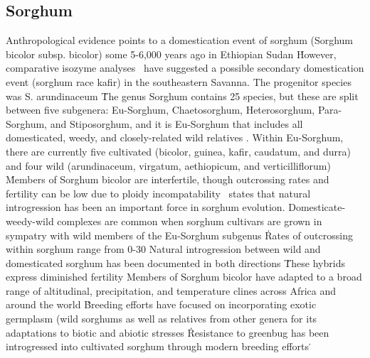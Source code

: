\documentclass[11pt]{article}
\begin{document}
\subsection*{Sorghum}
Anthropological evidence points to a domestication event of sorghum (Sorghum bicolor subsp. bicolor) some 5-6,000 years ago in Ethiopian Sudan \cite{smith2000sorghum}\.
However, comparative isozyme analyses \cite{shechter1975comparative}\ have suggested a possible secondary domestication event (sorghum race kafir) in the southeastern Savanna.
The progenitor species was S. arundinaceum \cite{doggett1988sorghum, harlan1971toward}\.
The genus Sorghum contains 25 species, but these are split between five subgenera: Eu-Sorghum, Chaetosorghum, Heterosorghum, Para-Sorghum, and Stiposorghum, and it is Eu-Sorghum that includes all domesticated, weedy, and closely-related wild relatives \cite{USDAARS2007, garber1950cytotaxonomic}.
Within Eu-Sorghum, there are currently five cultivated (bicolor, guinea, kafir, caudatum, and durra) and four wild (arundinaceum, virgatum, aethiopicum, and verticilliflorum) \cite{smith2000sorghum}\.
Members of Sorghum bicolor are interfertile, though outcrossing rates and fertility can be low due to ploidy incompatability \cite{doggett1988sorghum, arriola1996crop}\.

\cite{po1982sorghum}\ states that natural introgression has been an important force in sorghum evolution.
Domesticate-weedy-wild complexes are common when sorghum cultivars are grown in sympatry with wild members of the Eu-Sorghum subgenus \cite{de1978systematics, doggett1968disruptive, baker1972human}\.
Rates of outcrossing within sorghum range from 0-30%
Natural introgression between wild and domesticated sorghum has been documented in both directions \cite{kuhlman2006interspecific, aldrich1992restriction, aldrich1992patterns, doggett1988sorghum, baker1972migrations}\.
These hybrids express diminished fertility
Members of Sorghum bicolor have adapted to a broad range of altitudinal, precipitation, and temperature clines across Africa and around the world \cite{po1982sorghum, CWR}\.
Breeding efforts have focused on incorporating exotic germplasm (wild sorghums as well as relatives from other genera \cite{de1976cytogenetics}\) for its adaptations to biotic and abiotic stresses \cite{reddy2006current, po1982sorghum, johnson1979breeding}\.
Resistance to greenbug has been introgressed into cultivated sorghum through modern breeding efforts \cite{johnson1979breeding}\.
\end{document}
